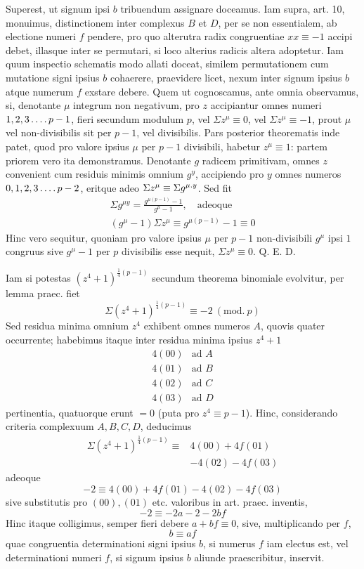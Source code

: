 Superest, ut signum ipsi $b$ tribuendum assignare doceamus. Iam supra, art. 10, monuimus, distinctionem inter complexus $B$ et $D$, per se non essentialem, ab electione numeri $f$ pendere, pro quo alterutra radix congruentiae $xx\equiv-1$ accipi debet, illasque inter se permutari, si loco alterius radicis altera adoptetur. Iam quum inspectio schematis modo allati doceat, similem permutationem cum mutatione signi ipsius $b$ cohaerere, praevidere licet, nexum inter signum ipsius $b$ atque numerum $f$ exstare debere. Quem ut cognoscamus, ante omnia observamus, si, denotante $\mu$ integrum non negativum, pro $z$ accipiantur omnes numeri $1,2,3\mathinner{.\,.\,.\,.} p-1$, fieri secundum modulum $p$, vel $\Sigma z^\mu\equiv0$, vel $\Sigma z^\mu\equiv-1$, prout $\mu$ vel non-divisibilis sit per $p-1$, vel divisibilis. Pars posterior theorematis inde patet, quod pro valore ipsius $\mu$ per $p-1$ divisibili, habetur $z^\mu\equiv1$: partem priorem vero ita demonstramus. Denotante $g$ radicem primitivam, omnes $z$ convenient cum residuis minimis omnium $g^y$, accipiendo pro $y$ omnes numeros $0,1,2,3\mathinner{.\,.\,.\,.} p-2$, eritque adeo $\Sigma z^\mu\equiv\Sigma g^{\mu\mathbin{.} y}$. Sed fit
\[
\begin{gathered}
\Sigma g^{\mu y}=\frac{g^{\mu(p-1)}-1}{g^\mu-1},\quad\text{adeoque}\\
(g^\mu-1)\Sigma z^\mu\equiv g^{\mu(p-1)}-1\equiv0
\end{gathered}
\]
Hinc vero sequitur, quoniam pro valore ipsius $\mu$ per $p-1$ non-divisibili $g^\mu$ ipsi $1$ congruus sive $g^\mu-1$ per $p$ divisibilis esse nequit, $\Sigma z^\mu\equiv0$. Q. E. D.

%
Iam si potestas $(z^4+1)^{\frac14(p-1)}$ secundum theorema binomiale evolvitur, per lemma praec. fiet
\[
\Sigma(z^4+1)^{\frac14(p-1)}\equiv-2\ (\mathrm{mod.}\ p)
\]
Sed residua minima omnium $z^4$ exhibent omnes numeros $A$, quovis quater occurrente; habebimus itaque inter residua minima ipsius $z^4+1$
\[
\begin{array}{rl}
4(00)&\text{ad }A\\
4(01)&\text{ad }B\\
4(02)&\text{ad }C\\
4(03)&\text{ad }D
\end{array}
\]
pertinentia, quatuorque erunt $=0$ (puta pro $z^4\equiv p-1$). Hinc, considerando criteria complexuum $A,B,C,D$, deducimus
\[
\begin{aligned}
\Sigma(z^4+1)^{\frac14(p-1)}\equiv{}&4(00)+4f(01)\\
&-4(02)-4f(03)
\end{aligned}
\]
adeoque
\[
-2\equiv4(00)+4f(01)-4(02)-4f(03)
\]
sive substitutis pro $(00),(01)$ etc. valoribus in art. praec. inventis,
\[
-2\equiv-2a-2-2bf
\]
Hinc itaque colligimus, semper fieri debere $a+bf\equiv0$, sive, multiplicando per $f$,
\[
b\equiv af
\]
quae congruentia determinationi signi ipsius $b$, si numerus $f$ iam electus est, vel determinationi numeri $f$, si signum ipsius $b$ aliunde praescribitur, inservit.

